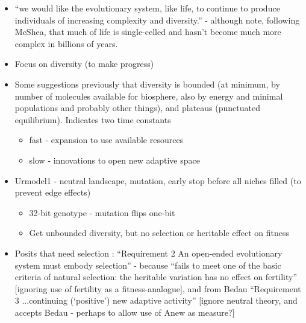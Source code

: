 \autocite{Maley1999}
\begin{itemize}
	\item
	
	``we would like the evolutionary system, like life, to continue to
	produce individuals of increasing complexity and diversity.'' -
	although note, following McShea, that much of life is single-celled
	and hasn't become much more complex in billions of years.
	
	\item
	
	Focus on diversity (to make progress)
	
	\item
	
	Some suggestions previously that diversity is bounded (at minimum, by
	number of molecules available for biosphere, also by energy and
	minimal populations and probably other things), and plateaus
	(punctuated equilibrium). Indicates two time constants
	
	
	\begin{itemize}
		\item
		
		fast - expansion to use available resources
		
		\item
		
		slow - innovations to open new adaptive space
		
	\end{itemize}
	\item
	
	Urmodel1 - neutral landscape, mutation, early stop before all niches
	filled (to prevent edge effects)
	
	
	\begin{itemize}
		\item
		
		32-bit genotype - mutation flips one-bit
		
		\item
		
		Get unbounded diversity, but no selection or heritable effect on
		fitness
		
	\end{itemize}
	\item
	
	Posits that need selection : ``Requirement 2 An open-ended
	evolutionary system must embody selection'' - because ``fails to meet
	one of the basic criteria of natural selection: the heritable
	variation has no effect on fertility'' {[}ignoring use of fertility as
	a fitness-analogue{]}, and from Bedau ``Requirement 3 ...continuing
	(`positive') new adaptive activity'' {[}ignore neutral theory, and
	accepts Bedau - perhaps to allow use of Anew as measure?{]}
	

\end{itemize}
